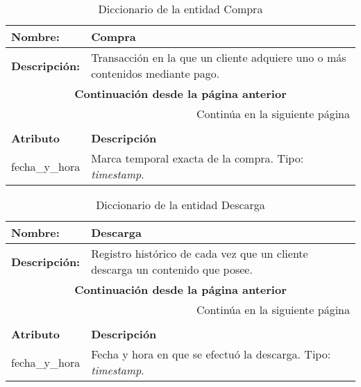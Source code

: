 \renewcommand{\arraystretch}{1.3}
\begin{longtable}{|p{3.5cm}|p{10cm}|}
\caption{Diccionario de la entidad Compra}
\label{tab:diccionarioCompra} \\ \hline
\textbf{Nombre:} & Compra \\ \hline
\textbf{Descripción:} & 
Transacción en la que un cliente adquiere uno o más contenidos mediante pago. \\ \hline
\endfirsthead
\multicolumn{2}{c}{\textbf{Continuación desde la página anterior}} \\ \hline
\endhead
\hline \multicolumn{2}{r}{{Continúa en la siguiente página}} \\ \hline
\endfoot
\hline
\endlastfoot
\multicolumn{2}{|p{13.5cm}|}{\textbf{ATRIBUTOS}} \\ \hline
\textbf{Atributo} & \textbf{Descripción} \\ \hline
fecha\_y\_hora & Marca temporal exacta de la compra.  
Tipo: \textit{timestamp}. \\ \hline
\end{longtable}

\renewcommand{\arraystretch}{1.3}
\begin{longtable}{|p{3.5cm}|p{10cm}|}
\caption{Diccionario de la entidad Descarga}
\label{tab:diccionarioDescarga} \\ \hline
\textbf{Nombre:} & Descarga \\ \hline
\textbf{Descripción:} & 
Registro histórico de cada vez que un cliente descarga un contenido que posee. \\ \hline
\endfirsthead
\multicolumn{2}{c}{\textbf{Continuación desde la página anterior}} \\ \hline
\endhead
\hline \multicolumn{2}{r}{{Continúa en la siguiente página}} \\ \hline
\endfoot
\hline
\endlastfoot
\multicolumn{2}{|p{13.5cm}|}{\textbf{ATRIBUTOS}} \\ \hline
\textbf{Atributo} & \textbf{Descripción} \\ \hline
fecha\_y\_hora & Fecha y hora en que se efectuó la descarga.  
Tipo: \textit{timestamp}. \\ \hline
\end{longtable}

